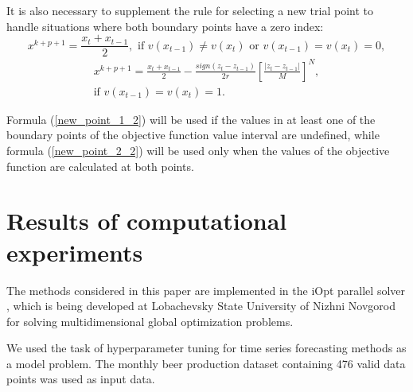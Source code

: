 \documentclass[runningheads]{llncs}
\begin{document}
It is also necessary to supplement the rule for selecting a new trial point to handle situations where both boundary points have a zero index:
\begin{equation}\label{new_point_1_2} 
x^{k+p+1} = \frac{x_t+x_{t-1}}{2}, \text{ if } v(x_{t-1}) \neq v(x_t) \text{ or } v(x_{t-1})=v(x_t)=0,
\end{equation}
\begin{equation}\label{new_point_2_2} 
\begin{split}
x^{k+p+1} = \frac{x_t+x_{t-1}}{2}-\frac{\textit{sign}{(z_t-z_{t-1})}}{2r} \left[ \frac{|z_t-z_{t-1}|}{M} \right]^N, \\
\text{if }  v(x_{t-1})=v(x_t) = 1.
\end{split}
\end{equation}

Formula (\ref{new_point_1_2}) will be used if the values in at least one of the boundary points of the objective function value interval are undefined, while formula (\ref{new_point_2_2}) will be used only when the values of the objective function are calculated at both points.

\section{Results of computational experiments}\label{sec:RCE}

The methods considered in this paper are implemented in the iOpt parallel solver \cite{iOptURL}, which is being developed at Lobachevsky State University of Nizhni Novgorod  for solving multidimensional global optimization problems.

We used the task of hyperparameter tuning for time series forecasting methods as a model problem. The monthly beer production dataset \cite{MonthlyBeerDataset,MonthlyBeerArticle} containing 476 valid data points was used as input data. 
\end{document}
